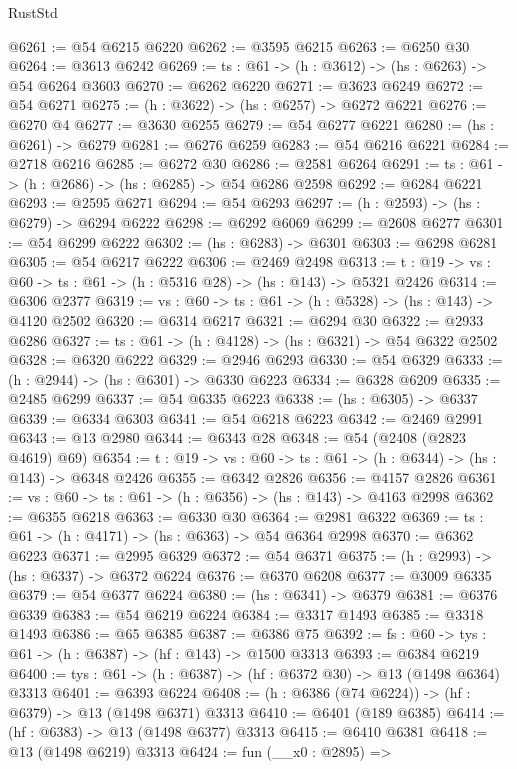 \begin{lexlean}{RustStd}
\begin{coremodule}
@6261 := @54 @6215 @6220
@6262 := @3595 @6215
@6263 := @6250 @30
@6264 := @3613 @6242
@6269 := {ts : @61} -> (h : @3612) -> (hs : @6263) -> @54 @6264 @3603
@6270 := @6262 @6220
@6271 := @3623 @6249
@6272 := @54 @6271
@6275 := (h : @3622) -> (hs : @6257) -> @6272 @6221
@6276 := @6270 @4
@6277 := @3630 @6255
@6279 := @54 @6277 @6221
@6280 := (hs : @6261) -> @6279
@6281 := @6276 @6259
@6283 := @54 @6216 @6221
@6284 := @2718 @6216
@6285 := @6272 @30
@6286 := @2581 @6264
@6291 := {ts : @61} -> (h : @2686) -> (hs : @6285) -> @54 @6286 @2598
@6292 := @6284 @6221
@6293 := @2595 @6271
@6294 := @54 @6293
@6297 := (h : @2593) -> (hs : @6279) -> @6294 @6222
@6298 := @6292 @6069
@6299 := @2608 @6277
@6301 := @54 @6299 @6222
@6302 := (hs : @6283) -> @6301
@6303 := @6298 @6281
@6305 := @54 @6217 @6222
@6306 := @2469 @2498
@6313 := {t : @19} -> {vs : @60} -> {ts : @61} -> (h : @5316 @28) -> (hs : @143) -> @5321 @2426
@6314 := @6306 @2377
@6319 := {vs : @60} -> {ts : @61} -> (h : @5328) -> (hs : @143) -> @4120 @2502
@6320 := @6314 @6217
@6321 := @6294 @30
@6322 := @2933 @6286
@6327 := {ts : @61} -> (h : @4128) -> (hs : @6321) -> @54 @6322 @2502
@6328 := @6320 @6222
@6329 := @2946 @6293
@6330 := @54 @6329
@6333 := (h : @2944) -> (hs : @6301) -> @6330 @6223
@6334 := @6328 @6209
@6335 := @2485 @6299
@6337 := @54 @6335 @6223
@6338 := (hs : @6305) -> @6337
@6339 := @6334 @6303
@6341 := @54 @6218 @6223
@6342 := @2469 @2991
@6343 := @13 @2980
@6344 := @6343 @28
@6348 := @54 (@2408 (@2823 @4619) @69)
@6354 := {t : @19} -> {vs : @60} -> {ts : @61} -> (h : @6344) -> (hs : @143) -> @6348 @2426
@6355 := @6342 @2826
@6356 := @4157 @2826
@6361 := {vs : @60} -> {ts : @61} -> (h : @6356) -> (hs : @143) -> @4163 @2998
@6362 := @6355 @6218
@6363 := @6330 @30
@6364 := @2981 @6322
@6369 := {ts : @61} -> (h : @4171) -> (hs : @6363) -> @54 @6364 @2998
@6370 := @6362 @6223
@6371 := @2995 @6329
@6372 := @54 @6371
@6375 := (h : @2993) -> (hs : @6337) -> @6372 @6224
@6376 := @6370 @6208
@6377 := @3009 @6335
@6379 := @54 @6377 @6224
@6380 := (hs : @6341) -> @6379
@6381 := @6376 @6339
@6383 := @54 @6219 @6224
@6384 := @3317 @1493
@6385 := @3318 @1493
@6386 := @65 @6385
@6387 := @6386 @75
@6392 := {fs : @60} -> {tys : @61} -> (h : @6387) -> (hf : @143) -> @1500 @3313
@6393 := @6384 @6219
@6400 := {tys : @61} -> (h : @6387) -> (hf : @6372 @30) -> @13 (@1498 @6364) @3313
@6401 := @6393 @6224
@6408 := (h : @6386 (@74 @6224)) -> (hf : @6379) -> @13 (@1498 @6371) @3313
@6410 := @6401 (@189 @6385)
@6414 := (hf : @6383) -> @13 (@1498 @6377) @3313
@6415 := @6410 @6381
@6418 := @13 (@1498 @6219) @3313
@6424 := fun (__x0 : @2895) =>

\end{coremodule}
\end{lexlean}
